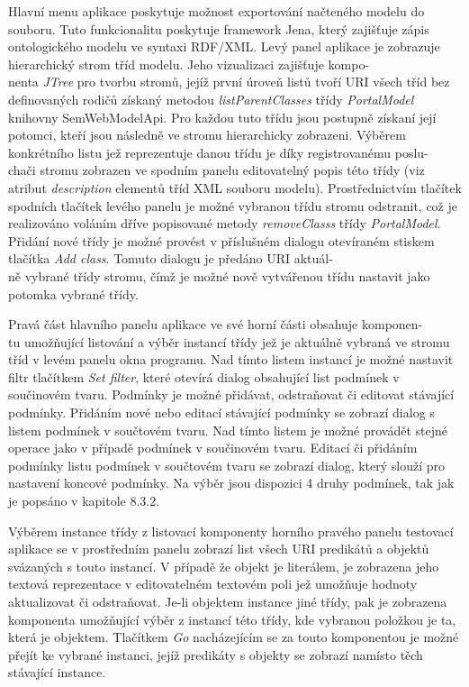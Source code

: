 \documentclass{projekt}
\begin{document}
Hlavní menu aplikace poskytuje možnost exportování načteného modelu do souboru. Tuto funkcionalitu poskytuje framework Jena, který zajišťuje zápis ontologického modelu ve syntaxi RDF/XML. Levý panel aplikace je zobrazuje hierarchický strom tříd modelu. Jeho vizualizaci zajišťuje kompo-\\nenta {\it JTree} pro tvorbu stromů, jejíž první úroveň listů tvoří URI všech tříd bez definovaných rodičů získaný metodou {\it listParentClasses} třídy {\it PortalModel} knihovny SemWebModelApi. Pro každou tuto třídu jsou postupně získaní její potomci, kteří jsou následně ve stromu hierarchicky zobrazeni. Výběrem konkrétního listu jež reprezentuje danou třídu je díky registrovanému poslu-\\chači stromu zobrazen ve spodním panelu editovatelný popis této třídy (viz atribut {\it description} elementů tříd XML souboru modelu). Prostřednictvím tlačítek spodních tlačítek levého panelu je možné vybranou třídu stromu odstranit, což je realizováno voláním dříve popisované metody {\it removeClasss} třídy {\it PortalModel}. Přidání nové třídy je možné provést v příslušném dialogu otevíraném stiskem tlačítka {\it Add class}. Tomuto dialogu je předáno URI aktuál-\\ně vybrané třídy stromu, čímž je možné nově vytvářenou třídu nastavit jako potomka vybrané třídy.

Pravá část hlavního panelu aplikace ve své horní části obsahuje komponen-\\tu umožňující listování a výběr instancí třídy jež je aktuálně vybraná ve stromu tříd v levém panelu okna programu. Nad tímto listem instancí je možné nastavit filtr tlačítkem {\it Set filter}, které otevírá dialog obsahující list podmínek v součinovém tvaru. Podmínky je možné přidávat, odstraňovat či editovat stávající podmínky. Přidáním nové nebo editací stávající podmínky se zobrazí dialog s listem podmínek v součtovém tvaru. Nad tímto listem je možné provádět stejné operace jako v případě podmínek v součinovém tvaru. Editací či přidáním podmínky listu podmínek v součtovém tvaru se zobrazí dialog, který slouží pro nastavení koncové podmínky. Na výběr jsou dispozici 4 druhy podmínek, tak jak je popsáno v kapitole 8.3.2.


Výběrem instance třídy z listovací komponenty horního pravého panelu testovací aplikace se v prostředním panelu zobrazí list všech URI predikátů a objektů svázaných s touto instancí. V případě že objekt je literálem, je zobrazena jeho textová reprezentace v editovatelném textovém poli jež umožňuje hodnoty aktualizovat či odstraňovat. Je-li objektem instance jiné třídy, pak je zobrazena komponenta umožňující výběr z instancí této třídy, kde vybranou položkou je ta, která je objektem. Tlačítkem {\it Go} nacházejícím se za touto komponentou je možné přejít ke vybrané instanci, jejíž predikáty s objekty se zobrazí namísto těch stávající instance.
\end{document}
